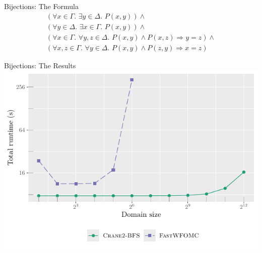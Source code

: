 \documentclass{beamer}
\begin{document}
\begin{frame}{Bijections: The Formula}
  \begin{gather*}
    (\forall x \in \Gamma\text{. }\exists y \in \Delta\text{. }P(x, y))\land{}\\
    (\forall y \in \Delta\text{. }\exists x \in \Gamma\text{. }P(x, y))\land{}\\
    (\forall x \in \Gamma\text{. }\forall y, z \in \Delta\text{. }P(x, y) \land P(x, z) \Rightarrow y = z)\land{}\\
    (\forall x, z \in \Gamma\text{. }\forall y \in \Delta\text{. }P(x, y) \land P(z, y) \Rightarrow x = z)
  \end{gather*}
\end{frame}

\begin{frame}{Bijections: The Results}
  \centering
  \includegraphics{bijections.pdf}
\end{frame}
\end{document}
